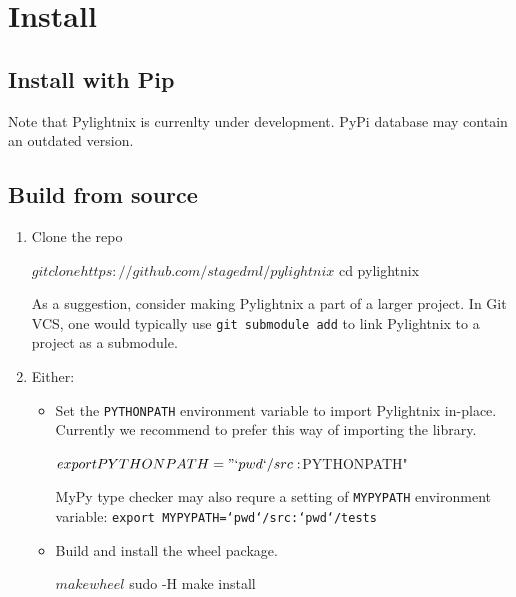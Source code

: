 \section{Install}

\subsection{Install with Pip}


Note that Pylightnix is currenlty under development. PyPi database may contain
an outdated version.

\subsection{Build from source}

\begin{enumerate}
  \item Clone the repo

    \begin{shellcode}
    $ git clone https://github.com/stagedml/pylightnix
    $ cd pylightnix
    \end{shellcode}

    As a suggestion, consider making Pylightnix a part of a larger project.
    In Git VCS, one would typically use \texttt{git submodule add} to link
    Pylightnix to a project as a submodule.

  \item Either:
    \begin{itemize}

      \item Set the \texttt{PYTHONPATH} environment variable to import
        Pylightnix in-place. Currently we recommend to prefer this way of
        importing the library.

        \begin{shellcode}
        $ export PYTHONPATH="`pwd`/src:$PYTHONPATH"
        \end{shellcode}

        MyPy type checker may also requre a setting of \texttt{MYPYPATH}
        environment variable: \texttt{export MYPYPATH=`pwd`/src:`pwd`/tests}

      \item Build and install the wheel package.
        \begin{shellcode}
        $ make wheel
        $ sudo -H make install
        \end{shellcode}

    \end{itemize}
\end{enumerate}

